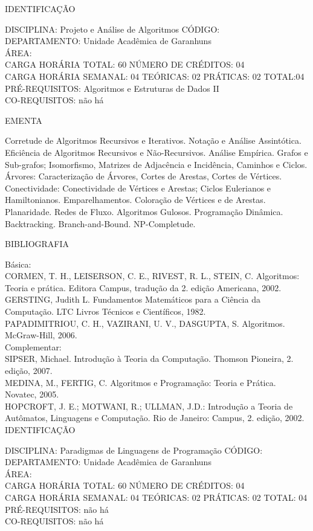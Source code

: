 \documentclass[
	12pt,				%
	openright,			%
  oneside,     %
	a4paper,			%
	chapter=TITLE,		%
	english,			%
	french,				%
	spanish,			%
	brazil				%
	]{abntex2}
\begin{document}
\begin{apendicesenv}
\newpage IDENTIFICAÇÃO

DISCIPLINA: Projeto e Análise de Algoritmos CÓDIGO:\\
DEPARTAMENTO: Unidade Acadêmica de Garanhuns\\
ÁREA: \\
CARGA HORÁRIA TOTAL: 60 NÚMERO DE CRÉDITOS: 04\\
CARGA HORÁRIA SEMANAL: 04 TEÓRICAS: 02 PRÁTICAS: 02 TOTAL:04\\
PRÉ-REQUISITOS: Algoritmos e Estruturas de Dados II\\
CO-REQUISITOS: não há

EMENTA 

Corretude de Algoritmos Recursivos e Iterativos. Notação e Análise
Assintótica. Eficiência de Algoritmos Recursivos e Não-Recursivos.
Análise Empírica. Grafos e Sub-grafos; Isomorfismo, Matrizes de
Adjacência e Incidência, Caminhos e Ciclos. Árvores: Caracterização de
Árvores, Cortes de Arestas, Cortes de Vértices. Conectividade:
Conectividade de Vértices e Arestas; Ciclos Eulerianos e Hamiltonianos.
Emparelhamentos. Coloração de Vértices e de Arestas. Planaridade. Redes
de Fluxo. Algoritmos Gulosos. Programação Dinâmica. Backtracking.
Branch-and-Bound. NP-Completude.

BIBLIOGRAFIA 

Básica:\\
CORMEN, T. H., LEISERSON, C. E., RIVEST, R. L., STEIN, C. Algoritmos:
Teoria e prática. Editora Campus, tradução da 2. edição Americana,
2002.\\
GERSTING, Judith L. Fundamentos Matemáticos para a Ciência da
Computação. LTC  Livros Técnicos e Científicos, 1982.\\
PAPADIMITRIOU, C. H., VAZIRANI, U. V., DASGUPTA, S. Algoritmos.
McGraw-Hill, 2006.\\
Complementar:\\
SIPSER, Michael. Introdução à Teoria da Computação. Thomson Pioneira, 2.
edição, 2007.\\
MEDINA, M., FERTIG, C. Algoritmos e Programação: Teoria e Prática.
Novatec, 2005.\\
HOPCROFT, J. E.; MOTWANI, R.; ULLMAN, J.D.: Introdução a Teoria de
Autômatos, Linguagens e Computação. Rio de Janeiro: Campus, 2. edição, 2002.\\


\newpage IDENTIFICAÇÃO

DISCIPLINA: Paradigmas de Linguagens de Programação CÓDIGO:\\ 
DEPARTAMENTO: Unidade Acadêmica de Garanhuns\\
ÁREA: \\
CARGA HORÁRIA TOTAL: 60 NÚMERO DE CRÉDITOS: 04\\
CARGA HORÁRIA SEMANAL: 04 TEÓRICAS: 02 PRÁTICAS: 02 TOTAL: 04\\
PRÉ-REQUISITOS: não há\\
CO-REQUISITOS: não há


\end{apendicesenv}
\end{document}
